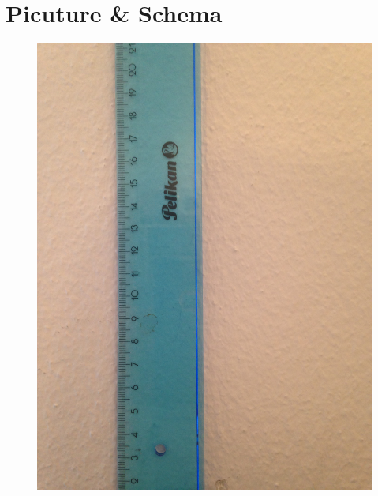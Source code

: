 \documentclass[12pt]{article}
\begin{document}
\section{Picuture \& Schema}

\begin{figure}[!htb]
	\centering
	\begin{minipage}{.5\textwidth}
		\centering
		\includegraphics[width=\linewidth, angle=-90]{figures/rulerOniPhone5C}
		\label{fig:Picture}
	\end{minipage}%
	\begin{minipage}{.5\textwidth}
		\centering

\end{minipage}
\end{figure}
\end{document}
